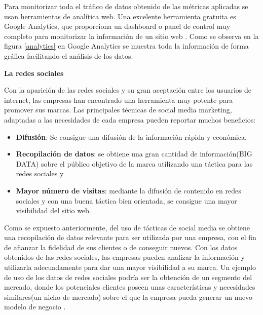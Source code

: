 Para monitorizar toda el tráfico de datos obtenido de las métricas aplicadas se usan herramientas de analítica web. Una excelente herramienta gratuita es Google Analytics, que proporciona un dashboard o panel de control muy completo para monitorizar la información de un sitio web \cite{analytics}. Como se observa en la figura \ref{analytics} en Google Analytics se muestra toda la información de forma gráfica facilitando el análisis de los datos.

\textbf{La redes sociales}

\vspace{5 mm}

Con la aparición de las redes sociales y su gran aceptación entre los usuarios de internet, las empresas han encontrado una herramienta muy potente para promover sus marcas. Las principales técnicas de social media marketing, adaptadas a las necesidades de cada empresa  pueden reportar muchos beneficios:

\begin{itemize}

\item \textbf{Difusión}: Se consigue una difusión de la información rápida y económica,

\item \textbf{Recopilación de datos}: se obtiene una gran cantidad de información(BIG DATA) sobre el público objetivo de la marca utilizando una táctica para las redes sociales y

\item \textbf{Mayor número de visitas}: mediante la difusión de contenido en redes sociales y con una buena táctica bien orientada, se consigue una mayor visibilidad del sitio web.

\end{itemize}

Como se expuesto anteriormente, del uso de tácticas de social media se obtiene una recopilación de datos relevante para ser utilizada por una empresa, con el fin de afianzar la fidelidad de sus clientes o de conseguir nuevos. Con los datos obtenidos de las redes sociales, las empresas pueden analizar la información y utilizarla adecuadamente para dar una mayor visibilidad a su marca. Un ejemplo de uso de los datos de redes sociales podría ser la obtención de un segmento del mercado, donde los potenciales clientes poseen unas características y necesidades similares(un nicho de mercado) sobre el que la empresa pueda generar un nuevo modelo de negocio \cite{social-media-marketing}.



